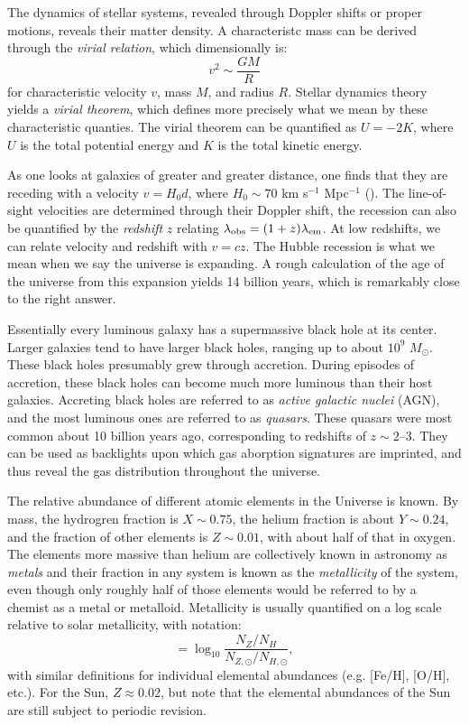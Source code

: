 The dynamics of stellar systems, revealed through Doppler shifts or
proper motions, reveals their matter density. A characteristc mass can
be derived through the {\it virial relation}, which dimensionally is:
\begin{equation}
v^2 \sim \frac{GM}{R}
\end{equation}
for characteristic velocity $v$, mass $M$, and radius $R$. Stellar
dynamics theory yields a {\it virial theorem}, which defines more
precisely what we mean by these characteristic quanties. The virial
theorem can be quantified as $U = -2 K$, where $U$ is the total
potential energy and $K$ is the total kinetic energy.

As one looks at galaxies of greater and greater distance, one finds
that they are receding with a velocity $v= H_0d$, where $H_0 \sim 70 $
km s$^{-1}$ Mpc$^{-1}$ (\citealt{freedman10a}). The line-of-sight
velocities are determined through their Doppler shift, the recession
can also be quantified by the {\it redshift} $z$ relating
$\lambda_{\rm obs} = (1+z)
\lambda_{\rm em}$. At low redshifts, we can relate velocity and
redshift with $v=cz$. The Hubble recession is what we mean when we say
the universe is expanding. A rough calculation of the age of the
universe from this expansion yields 14 billion years, which is
remarkably close to the right answer.

Essentially every luminous galaxy has a supermassive black hole at its
center. Larger galaxies tend to have larger black holes, ranging up to
about $10^9$ $M_\odot$. These black holes presumably grew through
accretion. During episodes of accretion, these black holes can become
much more luminous than their host galaxies. Accreting black holes are
referred to as {\it active galactic nuclei} (AGN), and the most
luminous ones are referred to as {\it quasars}. These quasars were
most common about 10 billion years ago, corresponding to redshifts of
$z\sim 2$--$3$. They can be used as backlights upon which gas
aborption signatures are imprinted, and thus reveal the gas
distribution throughout the universe.

The relative abundance of different atomic elements in the Universe is
known. By mass, the hydrogren fraction is $X \sim 0.75$, the helium
fraction is about $Y \sim 0.24$, and the fraction of other elements is
$Z \sim 0.01$, with about half of that in oxygen. The elements more
massive than helium are collectively known in astronomy as {\it
metals} and their fraction in any system is known as the {\it
metallicity} of the system, even though only roughly half of those
elements would be referred to by a chemist as a metal or
metalloid. Metallicity is usually quantified on a log scale relative
to solar metallicity, with notation:
\begin{equation}
[Z/H] = \log_{10} \frac{N_Z / N_H}{N_{Z, \odot} /
N_{H, \odot}}, 
\end{equation}
with similar definitions for individual elemental abundances
(e.g. [Fe/H], [O/H], etc.). For the Sun, $Z\approx 0.02$, but note
that the elemental abundances of the Sun are still subject to periodic
revision.

